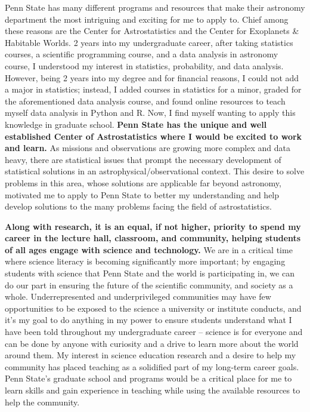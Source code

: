 \documentclass[12pt,letterpaper]{article}
\begin{document}
Penn State has many different programs and resources that make their astronomy department the most intriguing and exciting for me to apply to. Chief among these reasons are the Center for Astrostatistics and the Center for Exoplanets \& Habitable Worlds. 2 years into my undergraduate career, after taking statistics courses, a scientific programming course, and a data analysis in astronomy course, I understood my interest in statistics, probability, and data analysis. However, being 2 years into my degree and for financial reasons, I could not add a major in statistics; instead, I added courses in statistics for a minor, graded for the aforementioned data analysis course, and found online resources to teach myself data analysis in Python and R. Now, I find myself wanting to apply this knowledge in graduate school. \textbf{Penn State has the unique and well established Center of Astrostatistics where I would be excited to work and learn.} As missions and observations are growing more complex and data heavy, there are statistical issues that prompt the necessary development of statistical solutions in an astrophysical/observational context. This desire to solve problems in this area, whose solutions are applicable far beyond astronomy, motivated me to apply to Penn State to better my understanding and help develop solutions to the many problems facing the field of astrostatistics. 

\textbf{Along with research, it is an equal, if not higher, priority to spend my career in the lecture hall, classroom, and community, helping students of all ages engage with science and technology.} We are in a critical time where science literacy is becoming significantly more important; by engaging students with science that Penn State and the world is participating in, we can do our part in ensuring the future of the scientific community, and society as a whole. Underrepresented and underprivileged communities may have few opportunities to be exposed to the science a university or institute conducts, and it’s my goal to do anything in my power to ensure students understand what I have been told throughout my undergraduate career -- science is for everyone and can be done by anyone with curiosity and a drive to learn more about the world around them. My interest in science education research and a desire to help my community has placed teaching as a solidified part of my long-term career goals. Penn State's graduate school and programs would be a critical place for me to learn skills and gain experience in teaching while using the available resources to help the community.
\end{document}
